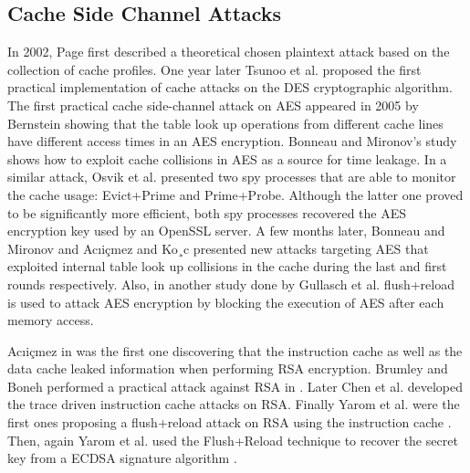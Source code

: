 \subsection{Cache Side Channel Attacks}
In 2002, Page \cite{Page2002} first described a theoretical chosen plaintext attack based on the collection of cache profiles.
One year later Tsunoo et al. \cite{Tsunoo2003Cryptanalysis} proposed the first practical implementation of cache attacks on the DES cryptographic algorithm.
The first practical cache side-channel attack on AES appeared in 2005 by Bernstein \cite{Bernstein2005Cache} showing that the table look up operations from different cache lines have different access times in an AES encryption.
Bonneau and Mironov’s study \cite{Bonneau2006} shows how to exploit cache collisions in AES as a source for time leakage.
In a similar attack, Osvik et al. \cite{Osvik2006} presented two spy processes that are able to monitor the cache usage: Evict+Prime and Prime+Probe.
Although the latter one proved to be significantly more efficient, both spy processes recovered the AES encryption key used by an OpenSSL server.
A few months later, Bonneau and Mironov \cite{joseph2006} and Ac{\i}i{\c{c}}mez and Ko¸c \cite{ac2006} presented new attacks targeting AES that exploited internal table look up collisions in the cache during the last and first rounds respectively.
Also,
in another study done by Gullasch et al. \cite{cachegame2011} flush+reload is used to attack AES encryption by blocking the execution of AES after each memory access.

Ac{\i}i{\c{c}}mez in \cite{Onur2007Yet} was the first one discovering that the instruction cache as well as the data cache leaked information when performing RSA encryption.
Brumley and Boneh performed a practical attack against RSA in \cite{Brumley2005Remote}.
Later Chen et al. developed the trace driven instruction cache attacks on RSA.
 Finally Yarom et al. were the first ones proposing a flush+reload attack on RSA using the instruction cache \cite{flushreload}.
  Then, again Yarom et al. used the Flush+Reload technique to recover the secret key from a ECDSA signature algorithm \cite{yarom2014recovering}.

